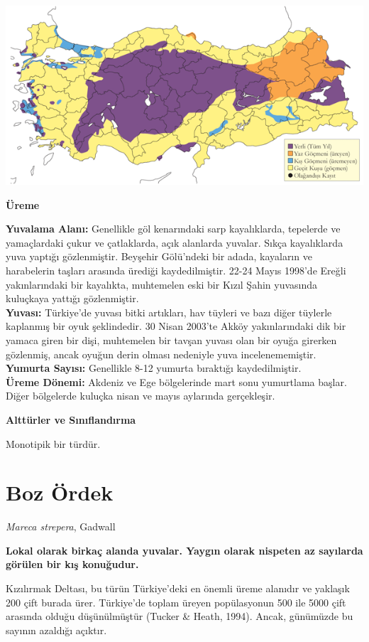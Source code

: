 \documentclass[
  a4paper,
  DIV=11,
  numbers=noendperiod]{scrreprt}
\begin{document}
\includegraphics{images/harita_Page_013.png}

\textbf{Üreme}

\textbf{Yuvalama Alanı:} Genellikle göl kenarındaki sarp kayalıklarda,
tepelerde ve yamaçlardaki çukur ve çatlaklarda, açık alanlarda yuvalar.
Sıkça kayalıklarda yuva yaptığı gözlenmiştir. Beyşehir Gölü'ndeki bir
adada, kayaların ve harabelerin taşları arasında ürediği kaydedilmiştir.
22-24 Mayıs 1998'de Ereğli yakınlarındaki bir kayalıkta, muhtemelen eski
bir Kızıl Şahin yuvasında kuluçkaya yattığı gözlenmiştir.\\
\textbf{Yuvası:} Türkiye'de yuvası bitki artıkları, hav tüyleri ve bazı
diğer tüylerle kaplanmış bir oyuk şeklindedir. 30 Nisan 2003'te Akköy
yakınlarındaki dik bir yamaca giren bir dişi, muhtemelen bir tavşan
yuvası olan bir oyuğa girerken gözlenmiş, ancak oyuğun derin olması
nedeniyle yuva incelenememiştir.\\
\textbf{Yumurta Sayısı:} Genellikle 8-12 yumurta bıraktığı
kaydedilmiştir.\\
\textbf{Üreme Dönemi:} Akdeniz ve Ege bölgelerinde mart sonu yumurtlama
başlar. Diğer bölgelerde kuluçka nisan ve mayıs aylarında gerçekleşir.

\textbf{Alttürler ve Sınıflandırma}

Monotipik bir türdür.

\section{Boz Ördek}\label{boz-uxf6rdek}

\emph{Mareca strepera}, Gadwall

\textbf{Lokal olarak birkaç alanda yuvalar. Yaygın olarak nispeten az
sayılarda görülen bir kış konuğudur.}

Kızılırmak Deltası, bu türün Türkiye'deki en önemli üreme alanıdır ve
yaklaşık 200 çift burada ürer. Türkiye'de toplam üreyen popülasyonun 500
ile 5000 çift arasında olduğu düşünülmüştür (Tucker \& Heath, 1994).
Ancak, günümüzde bu sayının azaldığı açıktır.
\end{document}
